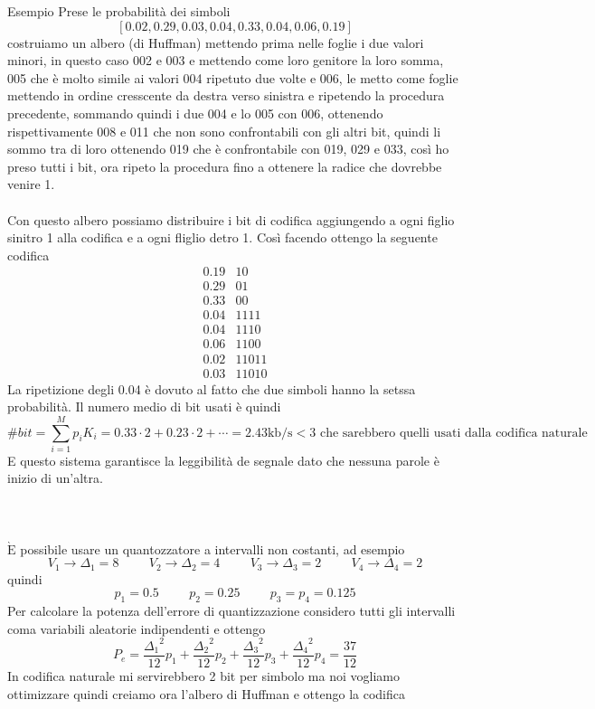 \documentclass{article}
\newcommand{\accapo}{\\\hspace*{1cm}\\}
\newcommand{\Eaccentata}{$\grave{\text{E}}$ }
\begin{document}
Esempio
Prese le probabilità dei simboli
\[[0.02,0.29,0.03,0.04,0.33,0.04,0.06,0.19]\]
costruiamo un albero (di Huffman) mettendo prima nelle foglie i due valori minori, in questo caso 002 e 003 e mettendo come loro genitore la loro somma, 005 che è molto simile ai valori 004 ripetuto due volte e 006, le metto come foglie mettendo in ordine cresscente da destra verso sinistra e ripetendo la procedura precedente, sommando quindi i due 004 e lo 005 con 006, ottenendo rispettivamente 008 e 011 che non sono confrontabili con gli altri bit, quindi li sommo tra di loro ottenendo 019 che è confrontabile con 019, 029 e 033, così ho preso tutti i bit, ora ripeto la procedura fino a ottenere la radice che dovrebbe venire 1.\accapo
Con questo albero possiamo distribuire i bit di codifica aggiungendo a ogni figlio sinitro 1 alla codifica e a ogni fliglio detro 1. Così facendo ottengo la seguente codifica
\[\begin{matrix}
    0.19&10\\
    0.29&01\\
    0.33&00\\
    0.04&1111\\
    0.04&1110\\
    0.06&1100\\
    0.02&11011\\
    0.03&11010
\end{matrix}\]
La ripetizione degli 0.04 è dovuto al fatto che due simboli hanno la setssa probabilità. Il numero medio di bit usati è quindi
\[\#bit=\sum_{i=1}^M p_i K_i=0.33\cdot 2+0.23\cdot 2+\cdots=2.43\text{kb/s}<3\text{ che sarebbero quelli usati dalla codifica naturale}\]
E questo sistema garantisce la leggibilità de segnale dato che nessuna parole è inizio di un'altra.\accapo\hspace*{1cm}\accapo
\Eaccentata possibile usare un quantozzatore a intervalli non costanti, ad esempio
\[V_1\to\Delta_1=8\hspace{1cm}V_2\to\Delta_2=4\hspace{1cm}V_3\to\Delta_3=2\hspace{1cm}V_4\to\Delta_4=2\]
quindi
\[p_1=0.5\hspace{1cm}p_2=0.25\hspace{1cm}p_3=p_4=0.125\]
Per calcolare la potenza dell'errore di quantizzazione considero tutti gli intervalli coma variabili aleatorie indipendenti e ottengo
\[P_e=\frac{{\Delta_1}^2}{12}p_1+\frac{{\Delta_2}^2}{12}p_2+\frac{{\Delta_3}^2}{12}p_3+\frac{{\Delta_4}^2}{12}p_4=\frac{37}{12}\]
In codifica naturale mi servirebbero 2 bit per simbolo ma noi vogliamo ottimizzare quindi creiamo ora l'albero di Huffman e ottengo la codifica
\end{document}
